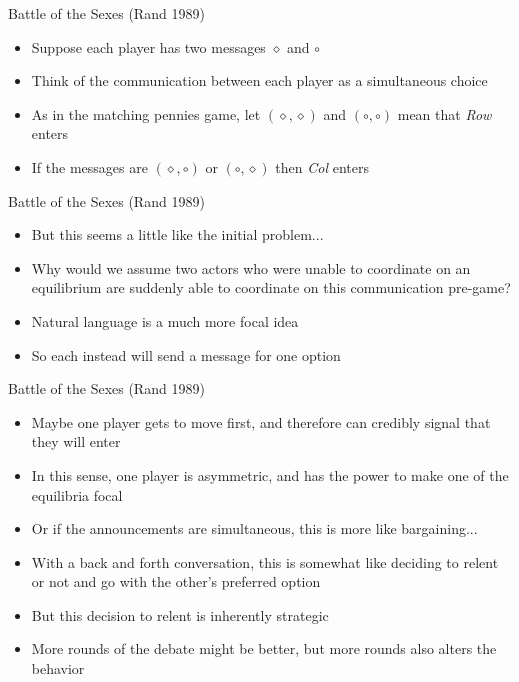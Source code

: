 \documentclass{beamer}
\begin{document}
\begin{frame}{Battle of the Sexes (Rand 1989)}
	\begin{itemize}
		\item Suppose each player has two messages $\diamond$ and $\circ$
		\item Think of the communication between each player as a simultaneous choice
		\item As in the matching pennies game, let $(\diamond,\diamond)$ and $(\circ,\circ)$  mean that \emph{Row} enters
		\item If the messages are $(\diamond,\circ)$ or $(\circ,\diamond)$ then \emph{Col} enters
	\end{itemize}
\end{frame}

\begin{frame}{Battle of the Sexes (Rand 1989)}
	\begin{itemize}
		\item But this seems a little like the initial problem...
		\item Why would we assume two actors who were unable to coordinate on an equilibrium are suddenly able to coordinate on this communication pre-game?
		\item Natural language is a much more focal idea
		\item So each instead will send a message for one option
	\end{itemize}
\end{frame}

\begin{frame}{Battle of the Sexes (Rand 1989)}
	\begin{itemize}
		\item Maybe one player gets to move first, and therefore can credibly signal that they will enter
		\item In this sense, one player is asymmetric, and has the power to make one of the equilibria focal
		\item Or if the announcements are simultaneous, this is more like bargaining...
		\item With a back and forth conversation, this is somewhat like deciding to relent or not and go with the other's preferred option
		\item But this decision to relent is inherently strategic
		\item More rounds of the debate might be better, but more rounds also alters the behavior
	\end{itemize}
\end{frame}
\end{document}
